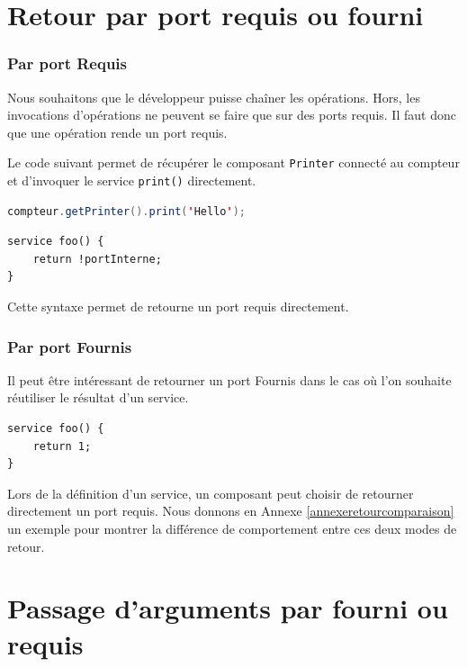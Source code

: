 \documentclass[11pt,a4paper,openany,oneside]{book}
\begin{document}
\section{Retour par port requis ou fourni}

\subsubsection{Par port Requis}
Nous souhaitons que le développeur puisse chaîner les opérations. Hors, les invocations d'opérations ne peuvent se faire que sur des ports requis. Il faut donc que une opération rende un port requis.

Le code suivant permet de récupérer le composant \texttt{Printer} connecté au compteur et d'invoquer le service \texttt{print()} directement.
\begin{lstlisting}[language=JAVA, frame=single, caption=Syntaxe d'un chaînage d'incocation en COMPO]
compteur.getPrinter().print('Hello');
\end{lstlisting}



\begin{lstlisting}[language=COMPO, frame=single, caption=Syntaxe de retour d'un port requis en COMPO]
service foo() {
    return !portInterne;
}
\end{lstlisting}

Cette syntaxe permet de retourne un port requis directement.


\subsubsection{Par port Fournis}
Il peut être intéressant de retourner un port Fournis dans le cas où l'on souhaite réutiliser le résultat d'un service.


\begin{lstlisting}[language=COMPO, frame=single, caption=Syntaxe de retour d'un port founis en COMPO]
service foo() {
    return 1;
}
\end{lstlisting}

Lors de la définition d'un service, un composant peut choisir de retourner directement un port requis.
Nous donnons en Annexe \ref{annexeretourcomparaison} un exemple pour montrer la différence de comportement entre ces deux modes de retour.


\section{Passage d'arguments par fourni ou requis}
\end{document}
